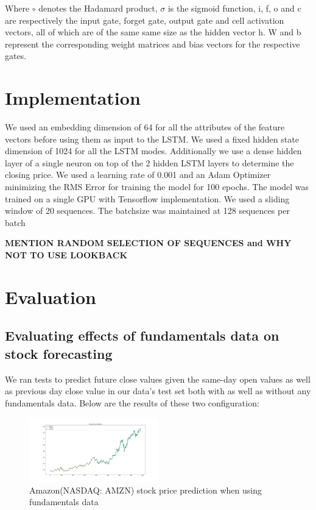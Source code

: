 \documentclass{article}
\begin{document}
Where $\circ$ denotes the Hadamard product, $\sigma$ is the sigmoid function, i, f, o and c are respectively the input gate, forget gate, output gate and cell activation vectors, all of which are of the same same size as the hidden vector h. W and b represent the corresponding weight matrices and bias vectors for the respective gates.

\section{Implementation}
\label{sec:implementation}

We used an embedding dimension of 64 for all the attributes of the feature vectors before using them as input to the LSTM. We used a fixed hidden state dimension of 1024 for all the LSTM modes. Additionally we use a dense hidden layer of a single neuron on top of the 2 hidden LSTM layers to determine the closing price. We used a learning rate of 0.001 and an Adam Optimizer minimizing the RMS Error for training the model for 100 epochs. The model was trained on a single GPU with Tensorflow implementation. We used a sliding window of 20 sequences. The batchsize was maintained at 128 sequences per batch

\textbf{MENTION RANDOM SELECTION OF SEQUENCES and WHY NOT TO USE LOOKBACK}

\section{Evaluation}
\label{sec:implementation}

\subsection{Evaluating effects of fundamentals data on stock forecasting}
\label{ssec:lstm_fundamentals_data}

We ran tests to predict future close values given the same-day open values as well as previous day close value in our data’s test set both with as well as without any fundamentals data. Below are the results of these two configuration:

\begin{figure}[h]
\centering
\includegraphics[width=0.5\textwidth]{amazon_incl_fundamentals}
\caption{Amazon(NASDAQ: AMZN) stock price prediction when using fundamentals data}
\label{fig:amazon_with_funda}
\end{figure}
\end{document}
